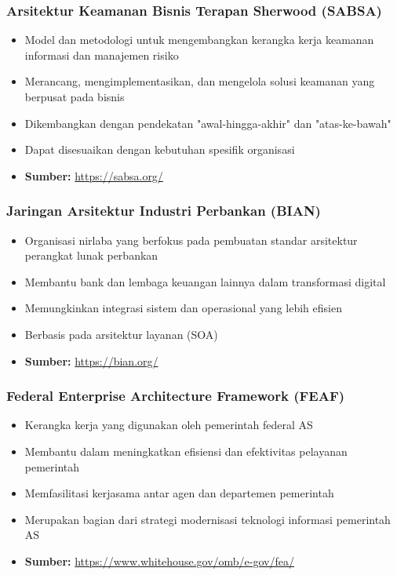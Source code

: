 \documentclass{beamer}
\begin{document}
	\begin{frame}
		\frametitle{Arsitektur Keamanan Bisnis Terapan Sherwood (SABSA)}
		\begin{itemize}
			\item Model dan metodologi untuk mengembangkan kerangka kerja keamanan informasi dan manajemen risiko
			\item Merancang, mengimplementasikan, dan mengelola solusi keamanan yang berpusat pada bisnis
			\item Dikembangkan dengan pendekatan "awal-hingga-akhir" dan "atas-ke-bawah"
			\item Dapat disesuaikan dengan kebutuhan spesifik organisasi
			\item \textbf{Sumber:} \url{https://sabsa.org/}
		\end{itemize}
	\end{frame}
	
	\begin{frame}
		\frametitle{Jaringan Arsitektur Industri Perbankan (BIAN)}
		\begin{itemize}
			\item Organisasi nirlaba yang berfokus pada pembuatan standar arsitektur perangkat lunak perbankan
			\item Membantu bank dan lembaga keuangan lainnya dalam transformasi digital
			\item Memungkinkan integrasi sistem dan operasional yang lebih efisien
			\item Berbasis pada arsitektur layanan (SOA)
			\item \textbf{Sumber:} \url{https://bian.org/}
		\end{itemize}
	\end{frame}
	
	\begin{frame}
		\frametitle{Federal Enterprise Architecture Framework (FEAF)}
		\begin{itemize}
			\item Kerangka kerja yang digunakan oleh pemerintah federal AS
			\item Membantu dalam meningkatkan efisiensi dan efektivitas pelayanan pemerintah
			\item Memfasilitasi kerjasama antar agen dan departemen pemerintah
			\item Merupakan bagian dari strategi modernisasi teknologi informasi pemerintah AS
			\item \textbf{Sumber:} \url{https://www.whitehouse.gov/omb/e-gov/fea/}
		\end{itemize}
	\end{frame}
	
\end{document}
